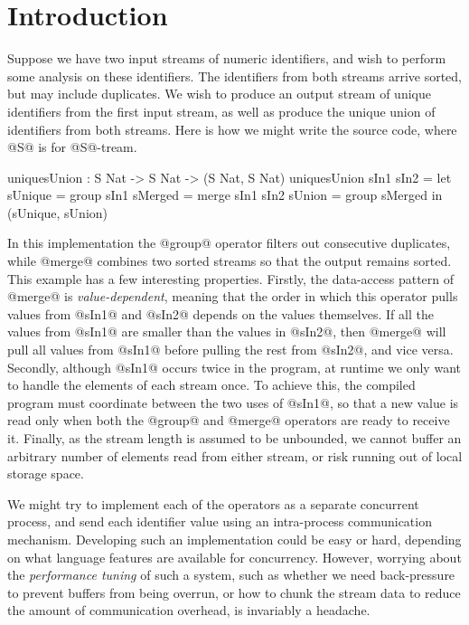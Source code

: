 \section{Introduction}
\label{s:Introduction}

Suppose we have two input streams of numeric identifiers, and wish to perform some analysis on these identifiers. The identifiers from both streams arrive sorted, but may include duplicates. We wish to produce an output stream of unique identifiers from the first input stream, as well as produce the unique union of identifiers from both streams. Here is how we might write the source code, where @S@ is for @S@-tream.
\begin{code}
  uniquesUnion : S Nat -> S Nat -> (S Nat, S Nat)
  uniquesUnion sIn1 sIn2
   = let  sUnique = group sIn1
          sMerged = merge sIn1 sIn2
          sUnion  = group sMerged
     in   (sUnique, sUnion)
\end{code}

In this implementation the @group@ operator filters out consecutive duplicates, while @merge@ combines two sorted streams so that the output remains sorted. This example has a few interesting properties. Firstly, the data-access pattern of @merge@ is \emph{value-dependent}, meaning that the order in which this operator pulls values from @sIn1@ and @sIn2@ depends on the values themselves. If all the values from @sIn1@ are smaller than the values in @sIn2@, then @merge@ will pull all values from @sIn1@ before pulling the rest from @sIn2@, and vice versa. Secondly, although @sIn1@ occurs twice in the program, at runtime we only want to handle the elements of each stream once. To achieve this, the compiled program must coordinate between the two uses of @sIn1@, so that a new value is read only when both the @group@ and @merge@ operators are ready to receive it. Finally, as the stream length is assumed to be unbounded, we cannot buffer an arbitrary number of elements read from either stream, or risk running out of local storage space.

We might try to implement each of the operators as a separate concurrent process, and send each identifier value using an intra-process communication mechanism. Developing such an implementation could be easy or hard, depending on what language features are available for concurrency. However, worrying about the \emph{performance tuning} of such a system, such as whether we need back-pressure to prevent buffers from being overrun, or how to chunk the stream data to reduce the amount of communication overhead, is invariably a headache. 

